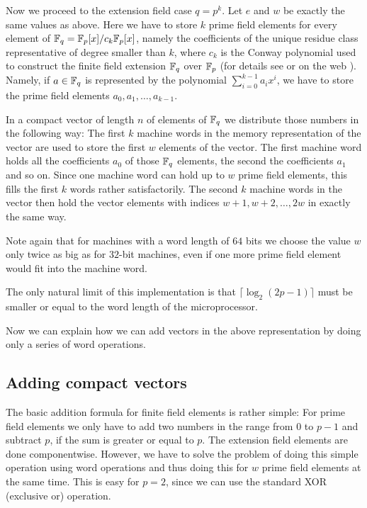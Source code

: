 Now we proceed to the extension field case $q=p^k$. Let $e$ and $w$ be
exactly the same values as above. Here we have to store $k$ prime field
elements for every element of $\mathbb{F}_q = \mathbb{F}_p[x]/c_k\mathbb{F}_p[x]$, namely the 
coefficients of the unique residue class representative of degree smaller 
than $k$, where $c_k$ is the Conway polynomial used to construct the 
%
finite field extension $\mathbb{F}_q$ over $\mathbb{F}_p$ (for details see \cite{Nickel}
or on the web \cite{ConwayFL}). Namely, if $a \in \mathbb{F}_q$ is represented by
the polynomial $\sum_{i=0}^{k-1} a_i x^i$, we have to store the prime 
field elements $a_0, a_1, \ldots, a_{k-1}$. 

In a compact vector of length $n$ of elements of $\mathbb{F}_q$ we distribute
those numbers in the following way: The first $k$ machine words in the
memory representation of the vector are used to store the first $w$
elements of the vector. The first machine word holds all the coefficients
$a_0$ of those $\mathbb{F}_q$ elements, the second the coefficients $a_1$ and so
on. Since one machine word can hold up to $w$ prime field elements, this
fills the first $k$ words rather satisfactorily. The second $k$ machine words
in the vector then hold the vector elements with indices 
$w+1, w+2, \ldots, 2w$ in exactly the same way.

Note again that for machines with a word length of $64$ bits we choose the
value $w$ only twice as big as for $32$-bit machines, even if one more
prime field element would fit into the machine word.

The only natural limit of this implementation is that 
$\lceil \log_2(2p-1) \rceil$ must be smaller or equal to the word length
of the microprocessor.

Now we can explain how we can add vectors in the above representation
by doing only a series of word operations.

\subsection{Adding compact vectors}

The basic addition formula for finite field elements is rather simple:
For prime field elements we only have to add two numbers in the range 
from $0$ to $p-1$ and
subtract $p$, if the sum is greater or equal to $p$. The extension
field elements are done componentwise. However, we have to solve
the problem of doing this simple operation using word operations and 
thus doing this for $w$ prime field elements at the same time.
This is easy for $p=2$, since we can use the standard XOR (exclusive or)
operation.

